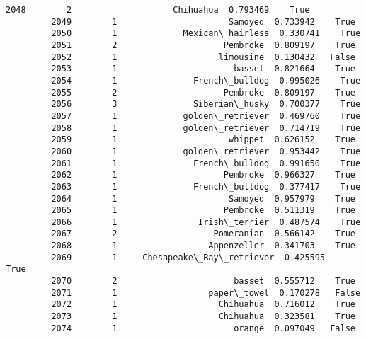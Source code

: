 \documentclass[11pt]{article}
\begin{document}
\begin{Verbatim}[commandchars=\\\{\}]
         2048        2                    Chihuahua  0.793469    True   
         2049        1                      Samoyed  0.733942    True   
         2050        1             Mexican\_hairless  0.330741    True   
         2051        2                     Pembroke  0.809197    True   
         2052        1                    limousine  0.130432   False   
         2053        1                       basset  0.821664    True   
         2054        1               French\_bulldog  0.995026    True   
         2055        2                     Pembroke  0.809197    True   
         2056        3               Siberian\_husky  0.700377    True   
         2057        1             golden\_retriever  0.469760    True   
         2058        1             golden\_retriever  0.714719    True   
         2059        1                      whippet  0.626152    True   
         2060        1             golden\_retriever  0.953442    True   
         2061        1               French\_bulldog  0.991650    True   
         2062        1                     Pembroke  0.966327    True   
         2063        1               French\_bulldog  0.377417    True   
         2064        1                      Samoyed  0.957979    True   
         2065        1                     Pembroke  0.511319    True   
         2066        1                Irish\_terrier  0.487574    True   
         2067        2                   Pomeranian  0.566142    True   
         2068        1                  Appenzeller  0.341703    True   
         2069        1     Chesapeake\_Bay\_retriever  0.425595    True   
         2070        2                       basset  0.555712    True   
         2071        1                  paper\_towel  0.170278   False   
         2072        1                    Chihuahua  0.716012    True   
         2073        1                    Chihuahua  0.323581    True   
         2074        1                       orange  0.097049   False   
         

\end{Verbatim}
\end{document}
